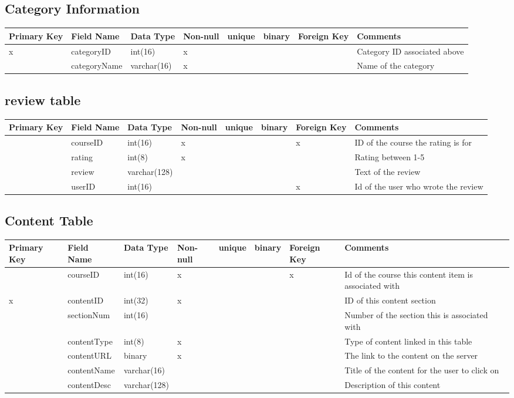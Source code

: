 \documentclass{article}
\begin{document}
\subsection{Category Information}
\begin{tabular}{|m{1cm} | m{2cm} | m{1.5cm}| m{1cm} | m{1cm}| m{1cm} | m{1cm}| m{4cm}| }
  \hline
  Primary Key & Field Name & Data Type & Non-null & unique & binary & Foreign Key & Comments\\ 
  \hline
  x & categoryID & int(16) & x & & & & Category ID associated above\\
  \hline
   & categoryName & varchar(16) & x & & & & Name of the category\\
  \hline
\end{tabular}

\subsection{review table}
\begin{tabular}{|m{1cm} | m{2cm} | m{2.0cm}| m{1cm} | m{1cm}| m{1cm} | m{1cm}| m{3.5cm}| }
  \hline
  Primary Key & Field Name & Data Type & Non-null & unique & binary & Foreign Key & Comments\\ 
  \hline
   & courseID & int(16) & x & & & x & ID of the course the rating is for\\
  \hline
   & rating & int(8) & x & & & & Rating between 1-5\\
  \hline
   & review & varchar(128) & & & & & Text of the review\\
  \hline
   & userID & int(16) & & & & x & Id of the user who wrote the review\\
  \hline
\end{tabular}

\subsection{Content Table}
\begin{tabular}{|m{1cm} | m{2cm} | m{2cm}| m{1cm} | m{1cm}| m{1cm} | m{1cm}| m{3.5cm}| }
  \hline
  Primary Key & Field Name & Data Type & Non-null & unique & binary & Foreign Key & Comments\\ 
  \hline
   & courseID & int(16) & x & & & x & Id of the course this content item is associated with\\
  \hline
  x & contentID & int(32) & x & & & & ID of this content section\\
  \hline
   & sectionNum & int(16) & & & & & Number of the section this is associated with\\
  \hline
   & contentType & int(8) & x & & & & Type of content linked in this table\\
  \hline
   & contentURL & binary & x & & & & The link to the content on the server\\
  \hline
   & contentName & varchar(16) & & & & & Title of the content for the user to click on\\
  \hline
   & contentDesc & varchar(128) & & & & & Description of this content\\
  \hline
\end{tabular}
\end{document}
